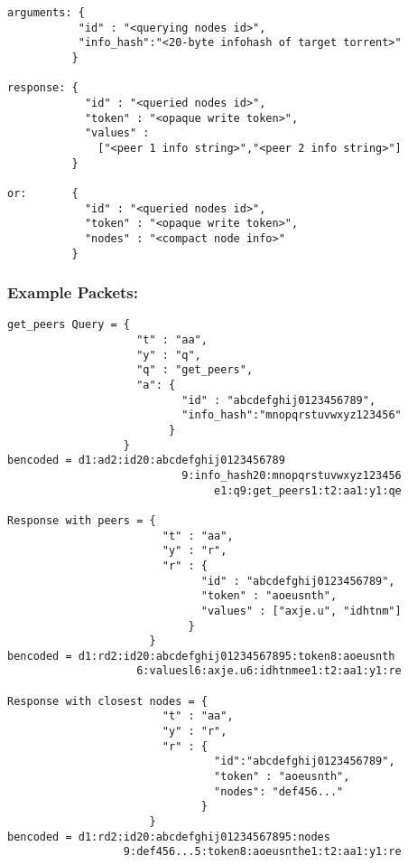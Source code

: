 \documentclass{article}
\begin{document}
\begin{verbatim}
arguments: {
           "id" : "<querying nodes id>",
           "info_hash":"<20-byte infohash of target torrent>"
          }

response: {
            "id" : "<queried nodes id>",
            "token" : "<opaque write token>",
            "values" : 
              ["<peer 1 info string>","<peer 2 info string>"]
          }

or:       {
            "id" : "<queried nodes id>",
            "token" : "<opaque write token>",
            "nodes" : "<compact node info>"
          }
\end{verbatim}

{\subsubsection {Example Packets:}}

\begin{verbatim}
get_peers Query = {
                    "t" : "aa",
                    "y" : "q",
                    "q" : "get_peers",
                    "a": {
                           "id" : "abcdefghij0123456789",
                           "info_hash":"mnopqrstuvwxyz123456"
                         }
                  }
bencoded = d1:ad2:id20:abcdefghij0123456789
                           9:info_hash20:mnopqrstuvwxyz123456
                                e1:q9:get_peers1:t2:aa1:y1:qe

Response with peers = {
                        "t" : "aa",
                        "y" : "r",
                        "r" : {
                              "id" : "abcdefghij0123456789",
                              "token" : "aoeusnth",
                              "values" : ["axje.u", "idhtnm"]
                            }
                      }
bencoded = d1:rd2:id20:abcdefghij01234567895:token8:aoeusnth
                    6:valuesl6:axje.u6:idhtnmee1:t2:aa1:y1:re

Response with closest nodes = {
                        "t" : "aa",
                        "y" : "r",
                        "r" : {
                                "id":"abcdefghij0123456789",
                                "token" : "aoeusnth",
                                "nodes": "def456..."
                              }
                      }
bencoded = d1:rd2:id20:abcdefghij01234567895:nodes
                  9:def456...5:token8:aoeusnthe1:t2:aa1:y1:re
\end{verbatim}
\end{document}
